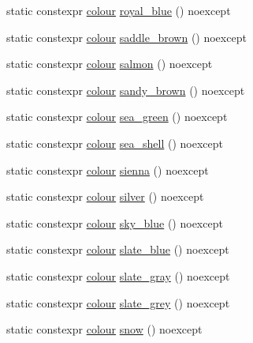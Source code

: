 \begin{DoxyCompactItemize}
\item 
static constexpr \mbox{\hyperlink{classmoka_1_1colour}{colour}} \mbox{\hyperlink{classmoka_1_1colour_a01e8353c6398f3b4348cdf1b30dd3ca4}{royal\+\_\+blue}} () noexcept
\item 
static constexpr \mbox{\hyperlink{classmoka_1_1colour}{colour}} \mbox{\hyperlink{classmoka_1_1colour_a3325d3ab6ddcba8bfd756ddadab901f9}{saddle\+\_\+brown}} () noexcept
\item 
static constexpr \mbox{\hyperlink{classmoka_1_1colour}{colour}} \mbox{\hyperlink{classmoka_1_1colour_a5213e584147379ed6803a9ea7de6152c}{salmon}} () noexcept
\item 
static constexpr \mbox{\hyperlink{classmoka_1_1colour}{colour}} \mbox{\hyperlink{classmoka_1_1colour_aa4464dcfc58ddc719455407163d27f73}{sandy\+\_\+brown}} () noexcept
\item 
static constexpr \mbox{\hyperlink{classmoka_1_1colour}{colour}} \mbox{\hyperlink{classmoka_1_1colour_ae0921dee800efb04f5c29391125860bf}{sea\+\_\+green}} () noexcept
\item 
static constexpr \mbox{\hyperlink{classmoka_1_1colour}{colour}} \mbox{\hyperlink{classmoka_1_1colour_ac9af1ded3280cef53f9e2c709865b9a5}{sea\+\_\+shell}} () noexcept
\item 
static constexpr \mbox{\hyperlink{classmoka_1_1colour}{colour}} \mbox{\hyperlink{classmoka_1_1colour_a016b25dff498d7fd2b8bbc8c4695a751}{sienna}} () noexcept
\item 
static constexpr \mbox{\hyperlink{classmoka_1_1colour}{colour}} \mbox{\hyperlink{classmoka_1_1colour_a23dce8ee8b640ba4865b3dcda926c555}{silver}} () noexcept
\item 
static constexpr \mbox{\hyperlink{classmoka_1_1colour}{colour}} \mbox{\hyperlink{classmoka_1_1colour_af2fda876258bf121bb2a833be220c73b}{sky\+\_\+blue}} () noexcept
\item 
static constexpr \mbox{\hyperlink{classmoka_1_1colour}{colour}} \mbox{\hyperlink{classmoka_1_1colour_a1f4310526da720db40aebe43952105f7}{slate\+\_\+blue}} () noexcept
\item 
static constexpr \mbox{\hyperlink{classmoka_1_1colour}{colour}} \mbox{\hyperlink{classmoka_1_1colour_ac6022346709ec89fb86ff79af2cabd96}{slate\+\_\+gray}} () noexcept
\item 
static constexpr \mbox{\hyperlink{classmoka_1_1colour}{colour}} \mbox{\hyperlink{classmoka_1_1colour_aafdbac070bb056e8efc65ed8d0061c8b}{slate\+\_\+grey}} () noexcept
\item 
static constexpr \mbox{\hyperlink{classmoka_1_1colour}{colour}} \mbox{\hyperlink{classmoka_1_1colour_a8e6a77758527c390aee243a253b494ef}{snow}} () noexcept

\end{DoxyCompactItemize}
